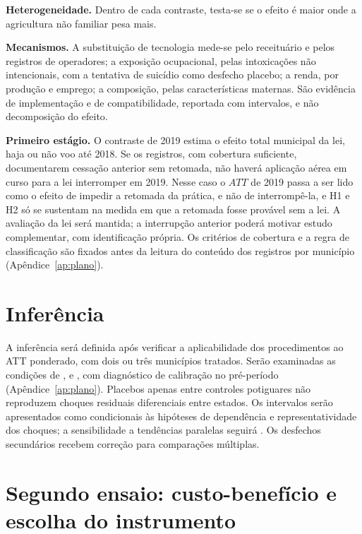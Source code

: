 \textbf{Heterogeneidade.} Dentro de cada contraste, testa-se se o efeito é
maior onde a agricultura não familiar pesa mais.

\textbf{Mecanismos.} A substituição de tecnologia mede-se pelo receituário e
pelos registros de operadores; a exposição ocupacional, pelas intoxicações não
intencionais, com a tentativa de suicídio como desfecho placebo; a renda, por
produção e emprego; a composição, pelas características maternas. São evidência
de implementação e de compatibilidade, reportada com intervalos, e não
decomposição do efeito.

\textbf{Primeiro estágio.} O contraste de 2019 estima o efeito total municipal
da lei, haja ou não voo até 2018. Se os registros, com cobertura suficiente, documentarem cessação anterior sem
retomada, não haverá aplicação aérea em curso para a lei interromper em 2019.
Nesse caso o $ATT$ de 2019 passa a ser lido como o efeito de impedir a
retomada da prática, e não de interrompê-la, e H1 e H2 só se sustentam na
medida em que a retomada fosse provável sem a lei. A avaliação da lei será mantida; a interrupção anterior
poderá motivar estudo complementar, com identificação própria.
Os critérios de cobertura e a regra de classificação são fixados antes da
leitura do conteúdo dos registros por município (Apêndice~\ref{ap:plano}).

\section{Inferência}

A inferência será definida após verificar a aplicabilidade dos procedimentos ao
ATT ponderado, com dois ou três municípios tratados. Serão examinadas as
condições de ,  e
, com diagnóstico de calibração no pré-período
(Apêndice~\ref{ap:plano}). Placebos apenas entre controles potiguares não
reproduzem choques residuais diferenciais entre estados. Os intervalos serão
apresentados como condicionais às hipóteses de dependência e representatividade
dos choques; a sensibilidade a tendências paralelas seguirá
. Os desfechos secundários recebem correção
para comparações múltiplas.

\section[Segundo ensaio: custo-benefício e instrumento]{Segundo ensaio: custo-benefício e escolha do instrumento}
\label{sec:cb}

